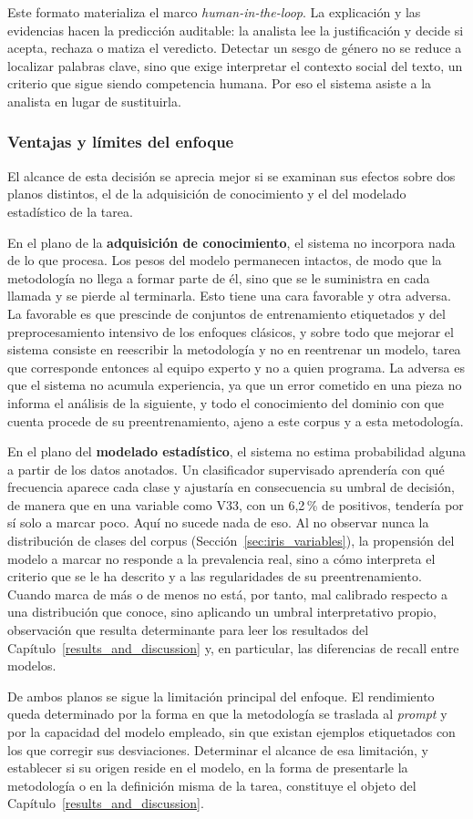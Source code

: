 Este formato materializa el marco
\textit{human-in-the-loop}. La explicación y las evidencias hacen la predicción
auditable: la analista lee la justificación y decide si acepta, rechaza o matiza
el veredicto. Detectar un sesgo de género no se reduce a localizar palabras
clave, sino que exige interpretar el contexto social del texto, un criterio que
sigue siendo competencia humana. Por eso el sistema asiste a la analista en lugar
de sustituirla.

\subsubsection{Ventajas y límites del enfoque}

El alcance de esta decisión se aprecia mejor si se examinan sus efectos sobre dos
planos distintos, el de la adquisición de conocimiento y el del modelado
estadístico de la tarea.

En el plano de la \textbf{adquisición de conocimiento}, el sistema no incorpora
nada de lo que procesa. Los pesos del modelo permanecen intactos, de modo que la
metodología no llega a formar parte de él, sino que se le suministra en cada
llamada y se pierde al terminarla. Esto tiene una cara favorable y otra adversa.
La favorable es que prescinde de conjuntos de entrenamiento etiquetados y del
preprocesamiento intensivo de los enfoques clásicos, y sobre todo que mejorar el
sistema consiste en reescribir la metodología y no en reentrenar un modelo, tarea
que corresponde entonces al equipo experto y no a quien programa. La adversa es
que el sistema no acumula experiencia, ya que un error cometido en una pieza no
informa el análisis de la siguiente, y todo el conocimiento del dominio con que
cuenta procede de su preentrenamiento, ajeno a este corpus y a esta metodología.

En el plano del \textbf{modelado estadístico}, el sistema no estima probabilidad
alguna a partir de los datos anotados. Un clasificador supervisado aprendería con
qué frecuencia aparece cada clase y ajustaría en consecuencia su umbral de
decisión, de manera que en una variable como V33, con un 6,2\,\% de positivos,
tendería por sí solo a marcar poco. Aquí no sucede nada de eso. Al no observar
nunca la distribución de clases del corpus (Sección~\ref{sec:iris_variables}), la
propensión del modelo a marcar no responde a la prevalencia real, sino a cómo
interpreta el criterio que se le ha descrito y a las regularidades de su
preentrenamiento. Cuando marca de más o de menos no está, por tanto, mal
calibrado respecto a una distribución que conoce, sino aplicando un umbral
interpretativo propio, observación que resulta determinante para leer los
resultados del Capítulo~\ref{results_and_discussion} y, en particular, las
diferencias de recall entre modelos.

De ambos planos se sigue la limitación principal del enfoque. El rendimiento queda
determinado por la forma en que la metodología se traslada al \textit{prompt} y
por la capacidad del modelo empleado, sin que existan ejemplos etiquetados con los
que corregir sus desviaciones. Determinar el alcance de esa limitación, y
establecer si su origen reside en el modelo, en la forma de presentarle la
metodología o en la definición misma de la tarea, constituye el objeto del
Capítulo~\ref{results_and_discussion}.
